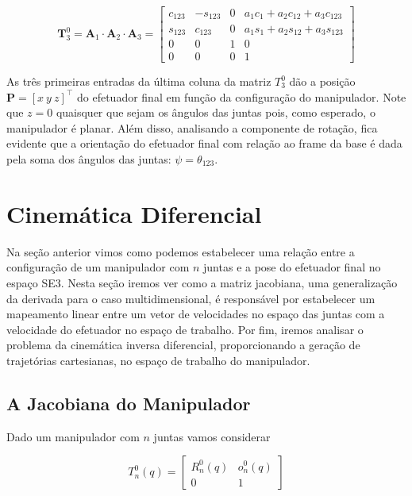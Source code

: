 \begin{equation}
    \mathbf{T}^0_3 = \mathbf{A}_1 \cdot \mathbf{A}_2 \cdot \mathbf{A}_3 = \begin{bmatrix}
        c_{123} & -s_{123} & 0 & a_1c_1 + a_2c_{12} + a_3c_{123} \\
        s_{123} & c_{123}  & 0 & a_1s_1 + a_2s_{12} + a_3s_{123} \\
        0       & 0        & 1 & 0                               \\
        0       & 0        & 0 & 1
    \end{bmatrix}
\end{equation}

As três primeiras entradas da última coluna da matriz \(T^0_3\) dão a posição
\(\mathbf{P} = {\left[ x \ y \ z \right]}^{\top}\) do efetuador final em função
da configuração do manipulador. Note que $z = 0$ quaisquer que sejam os ângulos
das juntas pois, como esperado, o manipulador é planar. Além disso, analisando
a componente de rotação, fica evidente que a orientação do efetuador final com
relação ao frame da base é dada pela soma dos ângulos das juntas: $\psi =
    \theta_{123}$.

\section{Cinemática Diferencial}

Na seção anterior vimos como podemos estabelecer uma relação entre a
configuração de um manipulador com $n$ juntas e a pose do efetuador final no
espaço SE3. Nesta seção iremos ver como a matriz jacobiana, uma generalização 
da derivada para o caso multidimensional, é responsável por estabelecer um 
mapeamento linear entre um vetor de velocidades no espaço das juntas com a 
velocidade do efetuador no espaço de trabalho. Por fim, iremos analisar o 
problema da cinemática inversa diferencial, proporcionando a geração de trajetórias 
cartesianas, no espaço de trabalho do manipulador.

\subsection{A Jacobiana do Manipulador}

Dado um manipulador com $n$ juntas vamos considerar

\begin{equation}
    T_{n}^{0}(q) = \begin{bmatrix}
        R_{n}^{0}(q) & o_{n}^{0}(q) \\
        0            & 1
    \end{bmatrix}
\end{equation}

